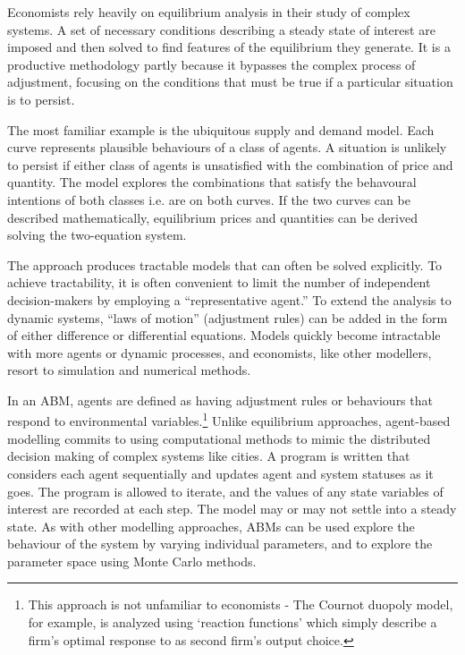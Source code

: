 {Economists rely heavily on equilibrium analysis in their study of complex systems. 
A set of necessary conditions describing a steady state of interest are imposed and then solved to find features of the equilibrium they generate. It is a productive methodology partly because it  bypasses the complex process of adjustment, focusing on the conditions that must be true if a particular situation is to persist.

The most familiar  example is the ubiquitous supply and demand model. Each curve represents plausible behaviours of a class of agents. A situation is unlikely to persist if either class of agents is unsatisfied with the combination of price and quantity. The model explores the combinations that satisfy the behavoural intentions of both classes i.e. are on both curves. If the two curves can be described mathematically, equilibrium prices and quantities can be derived solving the two-equation system.

The approach produces tractable models that can often be solved explicitly. To achieve tractability, it is often convenient 
to limit the number of independent decision-makers by employing a ``representative agent.'' To extend the analysis to dynamic systems, ``laws of motion'' (adjustment rules) can be added in the form of either difference or differential equations.  Models quickly become intractable with more agents or dynamic 
processes, and economists, like other modellers, resort to simulation 
and numerical methods. 

In an \gls{ABM}, agents are defined as having adjustment rules or behaviours that respond to environmental variables.\footnote{This approach is not unfamiliar to economists - The Cournot duopoly model, for example, is analyzed using `reaction functions' which simply describe a firm's optimal response to as second firm's output choice.} 
Unlike equilibrium approaches, agent-based modelling commits to using computational methods to mimic the distributed decision making of complex systems like cities. A program is written that considers each agent sequentially and updates agent and system statuses as it goes. The program is allowed to iterate, and the values of any state variables of interest are recorded at each step. The model may or may not settle into a steady state. As with other modelling approaches, ABMs can be used explore the behaviour of the system by varying individual parameters, and to explore the parameter space using Monte Carlo methods.

}

